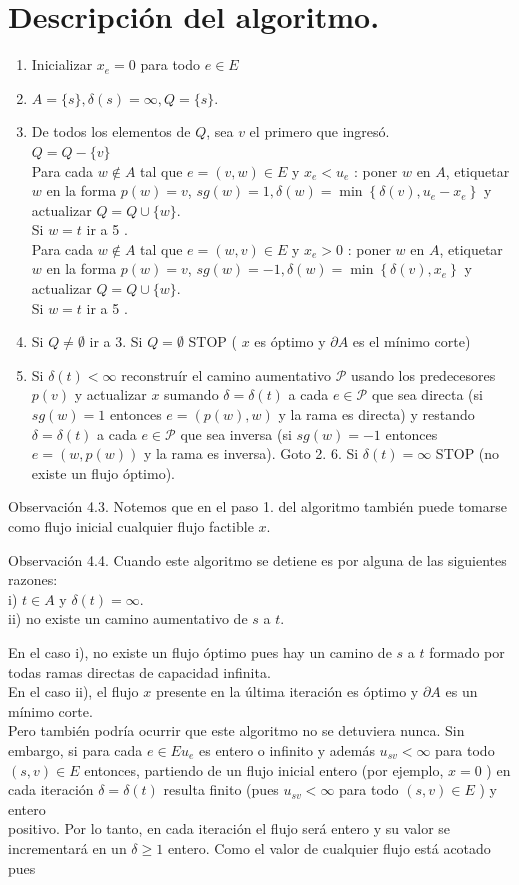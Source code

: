 \documentclass[10pt]{article}
\begin{document}
\section*{Descripción del algoritmo.}
\begin{enumerate}
  \item Inicializar $x_{e}=0$ para todo $e \in E$
  \item $A=\{s\}, \delta(s)=\infty, Q=\{s\}$.
  \item De todos los elementos de $Q$, sea $v$ el primero que ingresó.\\
$Q=Q-\{v\}$\\
Para cada $w \notin A$ tal que $e=(v, w) \in E$ y $x_{e}<u_{e}$ : poner $w$ en $A$, etiquetar $w$ en la forma $p(w)=v$, $s g(w)=1, \delta(w)=\min \left\{\delta(v), u_{e}-x_{e}\right\}$ y actualizar $Q=Q \cup\{w\}$.\\
Si $w=t$ ir a 5 .\\
Para cada $w \notin A$ tal que $e=(w, v) \in E$ y $x_{e}>0$ : poner $w$ en $A$, etiquetar $w$ en la forma $p(w)=v$, $s g(w)=-1, \delta(w)=\min \left\{\delta(v), x_{e}\right\}$ y actualizar $Q=Q \cup\{w\}$.\\
Si $w=t$ ir a 5 .
  \item Si $Q \neq \emptyset$ ir a 3. Si $Q=\emptyset$ STOP ( $x$ es óptimo y $\partial A$ es el mínimo corte)
  \item Si $\delta(t)<\infty$ reconstruír el camino aumentativo $\mathcal{P}$ usando los predecesores $p(v)$ y actualizar $x$ sumando $\delta=\delta(t)$ a cada $e \in \mathcal{P}$ que sea directa (si $s g(w)=1$ entonces $e=(p(w), w)$ y la rama es directa) y restando $\delta=\delta(t)$ a cada $e \in \mathcal{P}$ que sea inversa (si $s g(w)=-1$ entonces $e=(w, p(w))$ y la rama es inversa). Goto 2. 6. Si $\delta(t)=\infty$ STOP (no existe un flujo óptimo).
\end{enumerate}

Observación 4.3. Notemos que en el paso 1. del algoritmo también puede tomarse como flujo inicial cualquier flujo factible $x$.

Observación 4.4. Cuando este algoritmo se detiene es por alguna de las siguientes razones:\\
i) $t \in A$ y $\delta(t)=\infty$.\\
ii) no existe un camino aumentativo de $s$ a $t$.

En el caso i), no existe un flujo óptimo pues hay un camino de $s$ a $t$ formado por todas ramas directas de capacidad infinita.\\
En el caso ii), el flujo $x$ presente en la última iteración es óptimo y $\partial A$ es un mínimo corte.\\
Pero también podría ocurrir que este algoritmo no se detuviera nunca. Sin embargo, si para cada $e \in E u_{e}$ es entero o infinito y además $u_{s v}<\infty$ para todo $(s, v) \in E$ entonces, partiendo de un flujo inicial entero (por ejemplo, $x=0$ ) en cada iteración $\delta=\delta(t)$ resulta finito (pues $u_{s v}<\infty$ para todo $(s, v) \in E$ ) y entero\\
positivo. Por lo tanto, en cada iteración el flujo será entero y su valor se incrementará en un $\delta \geq 1$ entero. Como el valor de cualquier flujo está acotado pues
\end{document}
